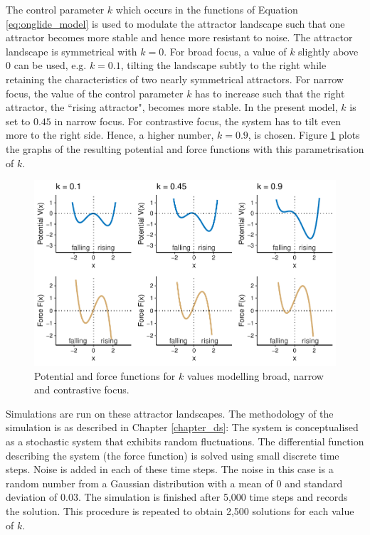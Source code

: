 The control parameter $k$ which occurs in the functions of Equation \ref{eq:onglide_model} is used to modulate the attractor landscape such that one attractor becomes more stable and hence more resistant to noise. The attractor landscape is symmetrical with $k=0$. For broad focus, a value of $k$ slightly above $0$ can be used, e.g. $k=0.1$, tilting the landscape subtly to the right while retaining the characteristics of two nearly symmetrical attractors. For narrow focus, the value of the control parameter $k$ has to increase such that the right attractor, the ``rising attractor", becomes more stable. In the present model, $k$ is set to $0.45$ in narrow focus. For contrastive focus, the system has to tilt even more to the right side. Hence, a higher number, $k=0.9$, is chosen. Figure \ref{fig:potentials_force_br_na_co} plots the graphs of the resulting potential and force functions with this parametrisation of $k$.

\begin{figure}[htbp]
\begin{center}
\includegraphics[width=\textwidth]{figures/ch6/potentials_force.pdf}
\caption{Potential and force functions for $k$ values modelling broad, narrow and contrastive focus.}
\label{fig:potentials_force_br_na_co}
\end{center}
\end{figure}

Simulations are run on these attractor landscapes. The methodology of the simulation is as described in Chapter \ref{chapter_ds}: The system is conceptualised as a stochastic system that exhibits random fluctuations. The differential function describing the system (the force function) is solved using small discrete time steps. Noise is added in each of these time steps. The noise in this case is a random number from a Gaussian distribution with a mean of $0$ and standard deviation of $0.03$. The simulation is finished after 5,000 time steps and records the solution. This procedure is repeated to obtain 2,500 solutions for each value of $k$.

